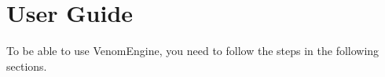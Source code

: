 \chapter{User Guide}
\hypertarget{userguide}{}\label{userguide}
To be able to use {\ttfamily Venom\+Engine}, you need to follow the steps in the following sections.





